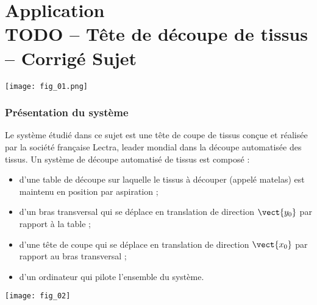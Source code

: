 \chapter*{Application  \\ 
TODO -- Tête de découpe de tissus -- \ifprof Corrigé \else Sujet \fi}

\iflivret {} \else
\ifprof  {} \else \fi
\fi


\marginnote[1cm]{
}


\begin{marginfigure}
\texttt{[image: fig\_01.png]}
\end{marginfigure}




\subsection*{Présentation du système}
\ifprof
\else
Le système étudié dans ce sujet est une tête de coupe de tissus conçue et réalisée par la société
française Lectra, leader mondial dans la découpe automatisée des tissus.
Un système de découpe automatisé de tissus est composé :
\begin{itemize}
\item d'une table de découpe sur laquelle le tissus à découper (appelé matelas) est maintenu en position
par aspiration ;
\item d'un bras transversal qui se déplace en translation de direction $\vect{y_0}$ par rapport à la table ;
\item d'une tête de coupe qui se déplace en translation de direction $\vect{x_0}$ par rapport au bras transversal ;
\item d'un ordinateur qui pilote l’ensemble du système. 
\end{itemize}

\begin{marginfigure}
\texttt{[image: fig\_02]}
\end{marginfigure}

